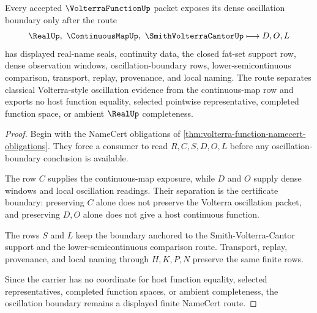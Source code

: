 \begin{theorem}
\label{thm:volterra-function-oscillation-boundary}
Every accepted $\VolterraFunctionUp$ packet exposes its dense oscillation boundary only after the route
$$
\RealUp,\ \ContinuousMapUp,\ \SmithVolterraCantorUp \longmapsto D,O,L
$$
has displayed real-name seals, continuity data, the closed fat-set support row, dense observation windows, oscillation-boundary rows, lower-semicontinuous comparison, transport, replay, provenance, and local naming. The route separates classical Volterra-style oscillation evidence from the continuous-map row and exports no host function equality, selected pointwise representative, completed function space, or ambient $\RealUp$ completeness.
\end{theorem}
\begin{proof}
Begin with the NameCert obligations of \autoref{thm:volterra-function-namecert-obligations}. They force a consumer to read $R,C,S,D,O,L$ before any oscillation-boundary conclusion is available.

The row $C$ supplies the continuous-map exposure, while $D$ and $O$ supply dense windows and local oscillation readings. Their separation is the certificate boundary: preserving $C$ alone does not preserve the Volterra oscillation packet, and preserving $D,O$ alone does not give a host continuous function.

The rows $S$ and $L$ keep the boundary anchored to the Smith-Volterra-Cantor support and the lower-semicontinuous comparison route. Transport, replay, provenance, and local naming through $H,K,P,N$ preserve the same finite rows.

Since the carrier has no coordinate for host function equality, selected representatives, completed function spaces, or ambient completeness, the oscillation boundary remains a displayed finite NameCert route.
\end{proof}


